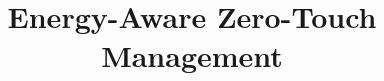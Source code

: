 \documentclass[conference]{IEEEtran}
\begin{document}
\frenchspacing
\renewcommand{\baselinestretch}{0.87}

\title{Energy-Aware Zero-Touch Management}


\maketitle

% 

\glsresetall


% 



\end{document}

